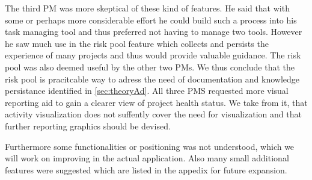 The third PM was more skeptical of these kind of features. He said that with some or perhaps more considerable effort he could build such a process into his task managing tool and thus preferred not having to manage two tools. However he saw much use in the risk pool feature which collects and persists the experience of many projects and thus would provide valuable guidance. The risk pool was also deemed useful by the other two PMs. We thus conclude that the risk pool is pracitcable way to adress the need of documentation and knowledge persistance identified in \ref{sec:theoryAd}.
All three PMS requested more visual reporting aid to gain a clearer view of project health status. We take from it, that activity visualization does not suffently cover the need for visualization and that further reporting graphics should be devised.

Furthermore some functionalities or positioning was not understood, which we will work on improving in the actual application. Also many small additional features were suggested which are listed in the appedix for future expansion.
